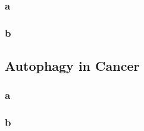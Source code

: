        \subsubsection{a}
        \subsubsection{b}


        
        
        
        
        
    \subsection{Autophagy in Cancer}
        \subsubsection{a}
        \subsubsection{b}
        
        
        


